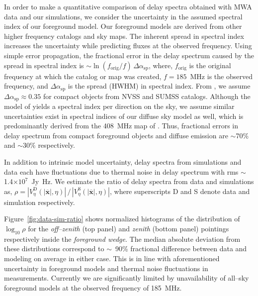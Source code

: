 \documentclass[preprint2,iop,numberedappendix]{emulateapj}
\begin{document}
In order to make a quantitative comparison of delay spectra obtained with MWA data and our simulations, we consider the uncertainty in the assumed spectral index of our foreground model. Our foreground models are derived from other higher frequency catalogs and sky maps. The inherent spread in spectral index increases the uncertainty while predicting fluxes at the observed frequency. Using simple error propagation, the fractional error in the delay spectrum caused by the spread in spectral index is $\sim \ln(f_\textrm{orig}/f)\,\Delta\alpha_\textrm{sp}$, where, $f_\textrm{orig}$ is the original frequency at which the catalog or map was created, $f=185$~MHz is the observed frequency, and $\Delta\alpha_\textrm{sp}$ is the spread (HWHM) in spectral index. From \citet{mau03}, we assume $\Delta\alpha_\textrm{sp} \approx 0.35$ for compact objects from NVSS and SUMSS catalogs. Although the model of \citet{deo08} yields a spectral index per direction on the sky, we assume similar uncertainties exist in spectral indices of our diffuse sky model as well, which is predominantly derived from the 408~MHz map of \citet{has82}. Thus, fractional errors in delay spectrum from compact foreground objects and diffuse emission are $\sim$70\% and $\sim$30\% respectively. 

In addition to intrinsic model uncertainty, delay spectra from simulations and data each have fluctuations due to thermal noise in delay spectrum with rms $\sim$ 1.4$\times 10^7$~Jy~Hz. We estimate the ratio of delay spectra from data and simulations as, $\rho = |V^\textrm{D}_\eta(|\overline{\mathbf{x}}|,\eta)|\,/\,|V^\textrm{S}_\eta(|\overline{\mathbf{x}}|,\eta)|$, where superscripts D and S denote data and simulation respectively. %

Figure~\ref{fig:data-sim-ratio} shows normalized histograms of the distribution of $\log_{10}\rho$ for the {\it off--zenith} (top panel) and {\it zenith} (bottom panel) pointings respectively inside the {\it foreground wedge}. The median absolute deviation from these distributions correspond to $\sim$~90\% fractional difference between data and modeling on average in either case. This is in line with aforementioned uncertainty in foreground models and thermal noise fluctuations in measurements. Currently we are significantly limited by unavailability of all--sky foreground models at the observed frequency of 185~MHz. 
\end{document}
